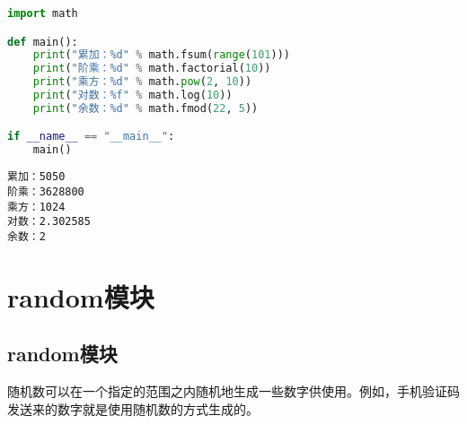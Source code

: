 
\begin{lstlisting}[language=Python]
import math

def main():
    print("累加：%d" % math.fsum(range(101)))
    print("阶乘：%d" % math.factorial(10))
    print("乘方：%d" % math.pow(2, 10))
    print("对数：%f" % math.log(10))
    print("余数：%d" % math.fmod(22, 5))

if __name__ == "__main__":
    main()
\end{lstlisting}

\begin{tcolorbox}
	\begin{verbatim}
累加：5050
阶乘：3628800
乘方：1024
对数：2.302585
余数：2
\end{verbatim}
\end{tcolorbox}

\newpage

\section{random模块}

\subsection{random模块}

随机数可以在一个指定的范围之内随机地生成一些数字供使用。例如，手机验证码发送来的数字就是使用随机数的方式生成的。

\begin{table}[H]
	\centering
	\caption{random模块}
\end{table}

